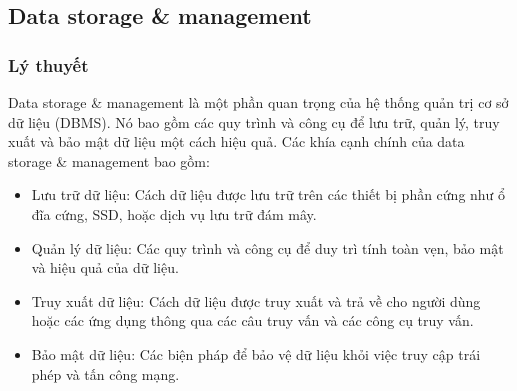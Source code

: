 \subsection{Data storage \& management}
\subsubsection{Lý thuyết}
\indent Data storage \& management là một phần quan trọng của hệ thống quản trị cơ sở dữ liệu (DBMS). Nó bao gồm các quy trình và công cụ để lưu trữ, quản lý, truy xuất và bảo mật dữ liệu một cách hiệu quả. Các khía cạnh chính của data storage \& management bao gồm:
\begin{itemize}
    \item Lưu trữ dữ liệu: Cách dữ liệu được lưu trữ trên các thiết bị phần cứng như ổ đĩa cứng, SSD, hoặc dịch vụ lưu trữ đám mây.
    \item Quản lý dữ liệu: Các quy trình và công cụ để duy trì tính toàn vẹn, bảo mật và hiệu quả của dữ liệu.
    \item Truy xuất dữ liệu: Cách dữ liệu được truy xuất và trả về cho người dùng hoặc các ứng dụng thông qua các câu truy vấn và các công cụ truy vấn.
    \item Bảo mật dữ liệu: Các biện pháp để bảo vệ dữ liệu khỏi việc truy cập trái phép và tấn công mạng.
\end{itemize}


